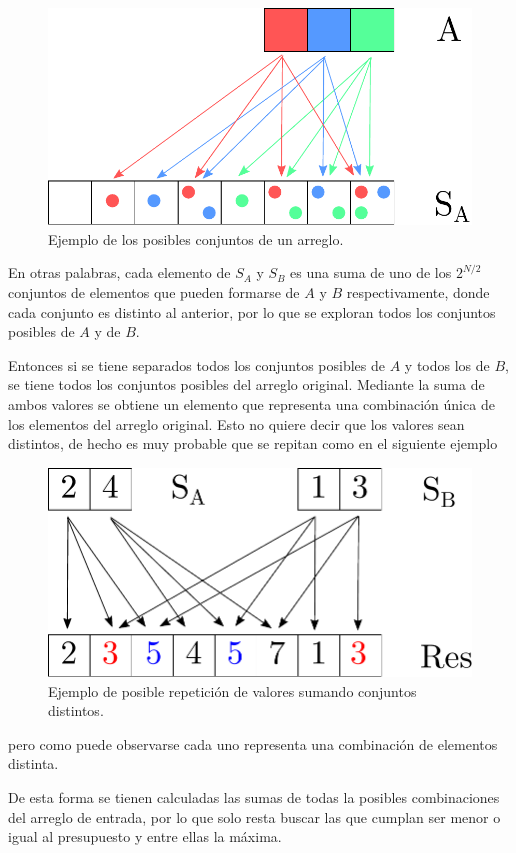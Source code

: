 \begin{figure}[H]
	\centering
	\includegraphics[scale=0.6]{imagenes/ex1_example1.pdf}
	\caption{Ejemplo de los posibles conjuntos de un arreglo.}
	\label{ej1:fig:combinations}
\end{figure}

En otras palabras, cada elemento de $S_A$ y $S_B$ es una suma de uno de los $2^{N / 2}$
conjuntos de elementos que pueden formarse de $A$ y $B$ respectivamente, donde cada conjunto es distinto al anterior, por lo que se exploran todos los conjuntos posibles de $A$ y de $B$.

Entonces si se tiene separados todos los conjuntos posibles de $A$ y todos los de $B$, se tiene todos los conjuntos posibles del arreglo original. Mediante la suma de ambos valores se obtiene un elemento que representa una combinación única de los elementos del arreglo original. Esto no quiere decir que los valores sean distintos, de hecho es muy probable que se repitan como en el siguiente ejemplo

\begin{figure}[H]
	\centering
	\includegraphics[scale=0.6]{imagenes/ex1_example2.pdf}
	\caption{Ejemplo de posible repetición de valores sumando conjuntos distintos.}
	\label{ej1:fig:value_repetition}
\end{figure}


pero como puede observarse cada uno representa una combinación de elementos distinta.

De esta forma se tienen calculadas las sumas de todas la posibles combinaciones del arreglo de entrada, por lo que solo resta buscar las que cumplan ser menor o igual al presupuesto y entre ellas la máxima.